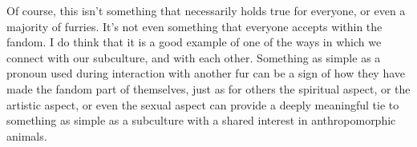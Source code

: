 Of course, this isn't something that necessarily holds true for everyone, or even a majority of furries.  It's not even something that everyone accepts within the fandom.  I do think that it is a good example of one of the ways in which we connect with our subculture, and with each other.  Something as simple as a pronoun used during interaction with another fur can be a sign of how they have made the fandom part of themselves, just as for others the spiritual aspect, or the artistic aspect, or even the sexual aspect can provide a deeply meaningful tie to something as simple as a subculture with a shared interest in anthropomorphic animals.
